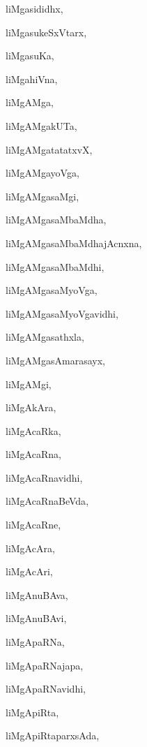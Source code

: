 \begin{multicols}{2}
{liMgasididhx}, \pageref{liMgasididhx}

{liMgasukeSxVtarx}, \pageref{liMgasukeSxVtarx}

{liMgasuKa}, \pageref{liMgasuKa}

{liMgahiVna}, \pageref{liMgahiVna}

{liMgAMga}, \pageref{liMgAMga}

{liMgAMgakUTa}, \pageref{liMgAMgakUTa}

{liMgAMgatatatxvX}, \pageref{liMgAMgatatatxvX}

{liMgAMgayoVga}, \pageref{liMgAMgayoVga}

{liMgAMgasaMgi}, \pageref{liMgAMgasaMgi}

{liMgAMgasaMbaMdha}, \pageref{liMgAMgasaMbaMdha}

{liMgAMgasaMbaMdhajAcnxna}, \pageref{liMgAMgasaMbaMdhajAcnxna}

{liMgAMgasaMbaMdhi}, \pageref{liMgAMgasaMbaMdhi}

{liMgAMgasaMyoVga}, \pageref{liMgAMgasaMyoVga}

{liMgAMgasaMyoVgavidhi}, \pageref{liMgAMgasaMyoVgavidhi}

{liMgAMgasathxla}, \pageref{liMgAMgasathxla}

{liMgAMgasAmarasayx}, \pageref{liMgAMgasAmarasayx}

{liMgAMgi}, \pageref{liMgAMgi}

{liMgAkAra}, \pageref{liMgAkAra}

{liMgAcaRka}, \pageref{liMgAcaRka}

{liMgAcaRna}, \pageref{liMgAcaRna}

{liMgAcaRnavidhi}, \pageref{liMgAcaRnavidhi}

{liMgAcaRnaBeVda}, \pageref{liMgAcaRnaBeVda}

{liMgAcaRne}, \pageref{liMgAcaRne}

{liMgAcAra}, \pageref{liMgAcAra}

{liMgAcAri}, \pageref{liMgAcAri}

{liMgAnuBAva}, \pageref{liMgAnuBAva}

{liMgAnuBAvi}, \pageref{liMgAnuBAvi}

{liMgApaRNa}, \pageref{liMgApaRNa}

{liMgApaRNajapa}, \pageref{liMgApaRNajapa}

{liMgApaRNavidhi}, \pageref{liMgApaRNavidhi}

{liMgApiRta}, \pageref{liMgApiRta}

{liMgApiRtaparxsAda}, \pageref{liMgApiRtaparxsAda}


\end{multicols}
